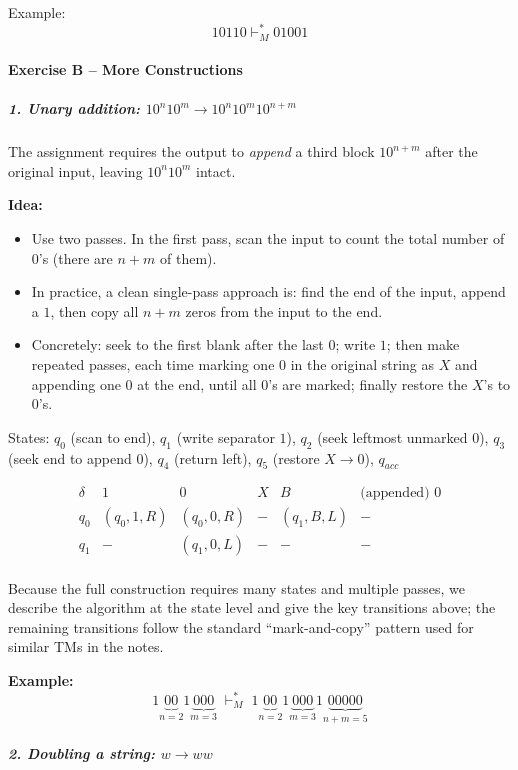 \documentclass[11pt, a4paper]{article}
\theoremstyle{definition}
\theoremstyle{remark}
\begin{document}
Example:
\[
10110 \vdash_M^* 01001
\]


\paragraph{Exercise B -- More Constructions}

\subparagraph{1. Unary addition: $10^n10^m \rightarrow 10^n10^m10^{n+m}$}

The assignment requires the output to \emph{append} a third block $10^{n+m}$ after the original input, leaving $10^n10^m$ intact.

\textbf{Idea:}
\begin{itemize}
    \item Use two passes. In the first pass, scan the input to count the total number of $0$'s (there are $n+m$ of them).
    \item In practice, a clean single-pass approach is: find the end of the input, append a $1$, then copy all $n+m$ zeros from the input to the end.
    \item Concretely: seek to the first blank after the last $0$; write $1$; then make repeated passes, each time marking one $0$ in the original string as $X$ and appending one $0$ at the end, until all $0$'s are marked; finally restore the $X$'s to $0$'s.
\end{itemize}

States: $q_0$ (scan to end), $q_1$ (write separator $1$), $q_2$ (seek leftmost unmarked $0$), $q_3$ (seek end to append $0$), $q_4$ (return left), $q_5$ (restore $X \to 0$), $q_{acc}$

\[
\begin{array}{c|c|c|c|c|c}
\delta & 1 & 0 & X & B & \text{(appended) } 0 \\
\hline
q_0 & (q_0,1,R) & (q_0,0,R) & - & (q_1,B,L) & - \\
q_1 & - & (q_1,0,L) & - & - & - \\
\end{array}
\]

Because the full construction requires many states and multiple passes, we describe the algorithm at the state level and give the key transitions above; the remaining transitions follow the standard ``mark-and-copy'' pattern used for similar TMs in the notes.

\textbf{Example:}
\[
1\underbrace{00}_{n=2}1\underbrace{000}_{m=3}
\;\vdash_M^*\;
1\underbrace{00}_{n=2}1\underbrace{000}_{m=3}1\underbrace{00000}_{n+m=5}
\]


\subparagraph{2. Doubling a string: $w \rightarrow ww$}
\end{document}
